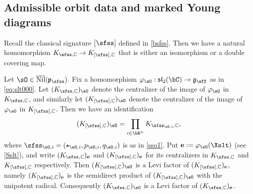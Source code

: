 \documentclass[11pt,a4paper]{amsart}
\def\fsl{\mathfrak{sl}}
\newcommand{\slt}{\operatorname{SL}_2(\mathbb{R})}
\newcommand{\g}{\mathfrak g}
\newcommand{\p}{\mathfrak p}
\newcommand{\X}{\mathbf{X}}
\numberwithin{equation}{section}
\theoremstyle{remark}
\def\slt{\fsl_2(\bC)}
\def\Nil{\overline{\mathrm{Nil}}}
\begin{document}
\subsection{Admissible orbit data and marked Young diagrams}
\label{sec:MYD}
\def\KCs{K_{[\sfss],\bC}}
\def\KCsX{(K_{[\sfss],\bC})_{\X}}
\def\KCsoX{(K_{[\sfss],\bC})_{\X}^{\circ}}

Recall the classical signature $[\sfss]$ defined in \eqref{bsfss}. Then we have a natural homomorphism $K_{\sfss,\C}\rightarrow K_{[\sfss],\C}$ that is either an isomorphism or a double covering map.

Let $\sO\in\Nil(\p_\sfss)$. Fix a homomorphism  $\varphi_{\sO}: \slt\rightarrow \g_\sff$  as in \eqref{eq:slt000}. Let $(K_{\sfss, \C})_\sO$ denote the centralizer of the image of $\varphi_{\sO}$ in $K_{\sfss, \C}$, and similarly let $(K_{[\sfss], \C})_\sO$ denote the centralizer of the image of $\varphi_{\sO}$ in $K_{[\sfss], \C}$. Then we have an identification
\[
(K_{[\sfss], \C})_\sO= \prod_{i\in \bN^{+}} K_{\sfss_{\sO,i},\C},
\]
where $\sfss_{\sO,i}=(\star_{\sO,i}, p_{\sO,i}, q_{\sO,i})$ is as in \eqref{sso1}.
Put $\mathbf e:=\varphi_\sO(\Xslt)$ (see \eqref{Sslt}), and write $(K_{\sfss,\C})_\mathbf e$ and $(K_{[\sfss],\C})_\mathbf e$ for its centralizers in $K_{\sfss,\C}$ and $K_{[\sfss],\C}$ respectively. Then $(K_{[\sfss], \C})_\sO$ is a Levi factor of $(K_{[\sfss], \C})_\mathbf e$, namely $(K_{[\sfss], \C})_\mathbf e$ is the semidirect product of $(K_{[\sfss], \C})_\sO$ with the unipotent radical. Consequently  $(K_{\sfss, \C})_\sO$ is a Levi factor of $(K_{\sfss, \C})_\mathbf e$.
\end{document}
